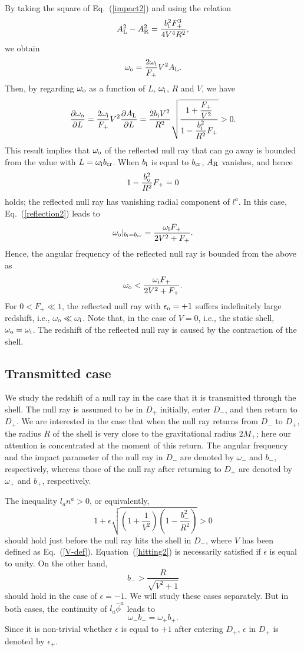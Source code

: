 \documentclass[aps,preprint,preprintnumber,nofootinbib,amsmath,amssymb,ascmac,bm,12pt]{revtex4}
\newcommand{\omi}{\omega_{\rm i}}
\newcommand{\omo}{\omega_{\rm o}}
\newcommand{\omp}{\omega_+}
\newcommand{\omm}{\omega_-}
\newcommand{\bi}{b_{\rm i}}
\newcommand{\bo}{b_{\rm o}}
\newcommand{\bpu}{b_+}
\newcommand{\bmi}{b_-}
\begin{document}
By taking the square of Eq.~(\ref{impact2}) and using the relation
$$
 A_{\rm L}^2 - A_{\rm R}^2= \frac{\bi^2F_+^3}{4 V^4 R^2}, 
$$
we obtain
$$
\omo=\frac{2\omi}{F_+}V^2A_{\rm L}.
$$
Then, by regarding $\omo$ as a function of $L$, $\omi$, $R$ and $V$, we have
$$
\frac{\partial \omo}{\partial L}= \frac{2\omi}{F_+}V^2\frac{\partial A_{\rm L}}{\partial L}
=\frac{2\bi V^2}{R^2}\sqrt{\frac{1+\dfrac{F_+}{V^2}}{1-\dfrac{\bi^2}{R^2}F_+}}>0.
$$
This result implies that $\omo$ of the reflected null ray that can go away is bounded from the value 
with $L=\omi b_{\rm cr}$. 
When $\bi$ is equal to $b_{\rm cr}$,  $A_{\rm R}$ vanishes, and hence  
$$
1-\dfrac{\bo^2}{R^2}F_+=0
$$
holds; the reflected null ray has vanishing radial component of $l^a$. 
In this case, Eq.~(\ref{reflection2}) leads to 
$$
\omo|_{\bi=b_{\rm cr}}=\frac{\omi F_+}{2V^2+F_+}.
$$
Hence, the angular frequency of the reflected null ray is bounded from the above as
$$
\omo<\frac{\omi F_+}{2V^2+F_+}.
$$
For $0<F_+\ll1$, the reflected null ray with $\epsilon_{\rm o}=+1$ 
suffers indefinitely large redshift, i.e., $\omo\ll\omi$. 
Note that, in the case of $V=0$, i.e., the static shell, $\omo=\omi$. The redshift of the reflected null ray 
is caused by the contraction of the shell. 



\subsection{Transmitted case}

We study the redshift of a null ray in the case that it is transmitted through the shell. 
The null ray is assumed to be in $D_+$ initially, enter $D_-$, and then 
return to $D_+$. We are interested in the case that when the null ray returns from $D_-$ to $D_+$, 
the radius $R$ of the shell is very close to the gravitational radius $2M_+$; here our attention 
is concentrated at the moment of this return. The angular frequency and the impact parameter 
of the null ray in $D_-$ are denoted by $\omm$ and $\bmi$, respectively, whereas  
those of the null ray after returning to $D_+$ are denoted by $\omp$ and $\bpu$, respectively. 

The inequality $l_an^a>0$, or equivalently,  
\begin{equation}
1+\epsilon\sqrt{\left(1+\frac{1}{V^2}\right)\left(1-\frac{\bmi^2}{R^2}\right)}>0 \label{hitting2}
\end{equation}
should hold just before the null ray hits the shell in $D_-$, where $V$ has been defined as 
Eq.~(\ref{V-def}). 
Equation~(\ref{hitting2}) is necessarily satisfied if $\epsilon$ is equal to unity. On the other hand, 
\begin{equation}
\bmi>\frac{R}{\sqrt{V^2+1}}
\end{equation}
should hold in the case of $\epsilon=-1$. We will study these cases separately. 
But in both cases, the continuity of $l_a\hat{\phi}^a$ leads to
$$
\omm \bmi=\omp \bpu.
$$
Since it is non-trivial whether $\epsilon$ is equal to $+1$ after entering $D_+$, 
$\epsilon$ in $D_+$ is denoted by $\epsilon_+$. 
\end{document}
